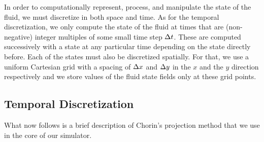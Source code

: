 \documentclass[11pt,a4paper,twoside,openright]{report}
\begin{document}
In order to computationally represent, process, and manipulate the state of the fluid, we must discretize in both space and time. As for the temporal discretization, we only compute the state of the fluid at times that are (non-negative) integer multiples of some small time step $\Delta t$. These are computed successively with a state at any particular time depending on the state directly before. Each of the states must also be discretized spatially. For that, we use a uniform Cartesian grid with a spacing of $\Delta x$ and $\Delta y$ in the $x$ and the $y$ direction respectively and we store values of the fluid state fields only at these grid points.

\subsection{Temporal Discretization}\label{sec:tdis}
What now follows is a brief description of Chorin's projection method that we use in the core of our simulator.
\end{document}
